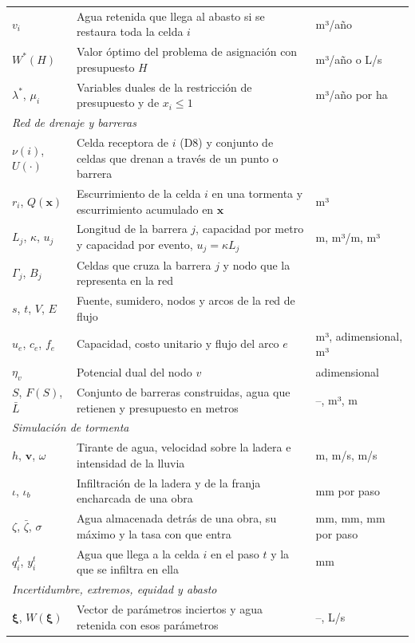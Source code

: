 \begin{table}[H]
\begin{tabularx}{\linewidth}{lXl}
$v_i$ & Agua retenida que llega al abasto si se restaura toda la celda $i$ & m³/año \\
$W^\ast(H)$ & Valor óptimo del problema de asignación con presupuesto $H$ & m³/año o L/s \\
$\lambda^\ast$, $\mu_i$ & Variables duales de la restricción de presupuesto y de $x_i\le1$ & m³/año por ha \\
\multicolumn{3}{l}{\textit{Red de drenaje y barreras}}\\
$\nu(i)$, $U(\cdot)$ & Celda receptora de $i$ (D8) y conjunto de celdas que drenan a través de un punto o barrera & \\
$r_i$, $Q(\mathbf x)$ & Escurrimiento de la celda $i$ en una tormenta y escurrimiento acumulado en $\mathbf x$ & m³ \\
$L_j$, $\kappa$, $u_j$ & Longitud de la barrera $j$, capacidad por metro y capacidad por evento, $u_j=\kappa L_j$ & m, m³/m, m³ \\
$\Gamma_j$, $B_j$ & Celdas que cruza la barrera $j$ y nodo que la representa en la red & \\
$s$, $t$, $V$, $E$ & Fuente, sumidero, nodos y arcos de la red de flujo & \\
$u_e$, $c_e$, $f_e$ & Capacidad, costo unitario y flujo del arco $e$ & m³, adimensional, m³ \\
$\eta_v$ & Potencial dual del nodo $v$ & adimensional \\
$S$, $F(S)$, $\bar L$ & Conjunto de barreras construidas, agua que retienen y presupuesto en metros & --, m³, m \\
\multicolumn{3}{l}{\textit{Simulación de tormenta}}\\
$h$, $\mathbf v$, $\omega$ & Tirante de agua, velocidad sobre la ladera e intensidad de la lluvia & m, m/s, m/s \\
$\iota$, $\iota_b$ & Infiltración de la ladera y de la franja encharcada de una obra & mm por paso \\
$\zeta$, $\bar\zeta$, $\sigma$ & Agua almacenada detrás de una obra, su máximo y la tasa con que entra & mm, mm, mm por paso \\
$q_i^t$, $y_i^t$ & Agua que llega a la celda $i$ en el paso $t$ y la que se infiltra en ella & mm \\
\multicolumn{3}{l}{\textit{Incertidumbre, extremos, equidad y abasto}}\\
$\boldsymbol\xi$, $W(\boldsymbol\xi)$ & Vector de parámetros inciertos y agua retenida con esos parámetros & --, L/s \\

\end{tabularx}
\end{table}

